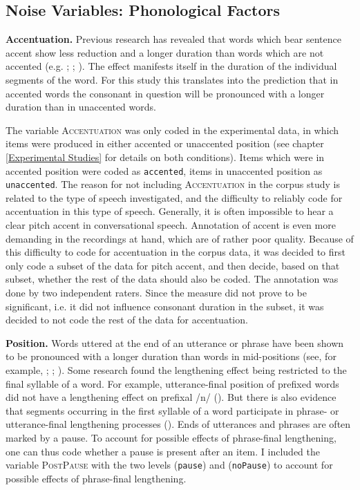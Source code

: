 \subsection{Noise Variables: Phonological Factors}

\textbf{Accentuation.} Previous research has revealed that words which bear sentence accent show less reduction and a longer duration than words which are not accented (e.g. \citealt{Sluijter.1996}; \citealt{Sugahara.2009}; \citealt{Bergmann.}). The  effect manifests itself in the duration of the individual segments of the word. For this study this translates into the prediction that in accented words the consonant in question will be pronounced with a longer duration than in unaccented words. 

The variable \textsc{Accentuation} was only coded in the experimental data, in which items were produced in either accented or unaccented position (see chapter \ref{Experimental Studies} for details on both conditions). Items which were in accented position were coded as \texttt{accented}, items in unaccented position as \texttt{unaccented}. 
The reason for not including \textsc{Accentuation} in the corpus study is related to the type of speech investigated, and the difficulty to reliably code for accentuation in this type of speech. Generally, it is often impossible to hear a clear pitch accent in conversational speech. 
Annotation of accent is even more demanding in the recordings at hand, which are of rather poor quality. Because of this difficulty to code for accentuation in the corpus data, it was decided to first only code a subset of the data for pitch accent, and then decide, based on that subset, whether the rest of the data should also be coded. The annotation was done by two independent raters. Since the measure did not prove to be significant, i.e. it did not influence consonant duration in the subset, it was decided to not code the rest of the data for accentuation.\\  
\vspace*{-0.3cm}

\textbf{Position.} Words uttered at the end of an utterance or phrase have been shown to be pronounced with a longer duration than words in mid-positions (see, for example,  \citealt{Berkovits.1993}; \citealt{Hay.2007}; \citealt{Oller.1973}). Some research found the lengthening effect being restricted to the final syllable of a word. For example, utterance-final position of prefixed words did not have a lengthening effect on prefixal /n/ (\citealt{Hay.2007}). But there is also evidence that segments occurring in the first syllable of a word participate in phrase- or utterance-final lengthening processes (\citealt{Oller.1973}). Ends of utterances and phrases are often marked by a pause. To account for possible effects of phrase-final lengthening, one can thus code whether a pause is present after an item. I included the variable \textsc{PostPause} with the two levels (\texttt{pause}) and (\texttt{noPause}) to account for possible effects of phrase-final lengthening. 

